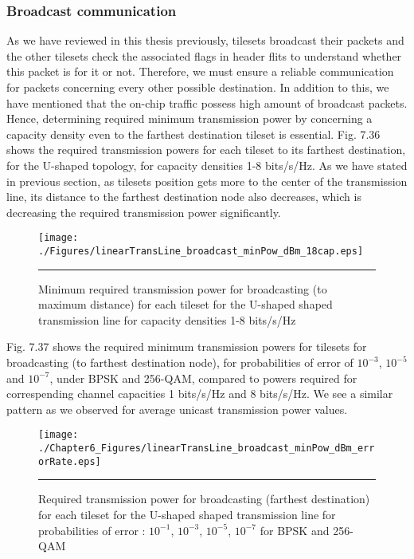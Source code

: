 \subsubsection{Broadcast communication}

As we have reviewed in this thesis previously, tilesets broadcast their packets and the other tilesets check the associated flags in header flits to understand whether this packet is for it or not. Therefore, we must ensure a reliable communication for packets concerning every other possible destination. In addition to this, we have mentioned that the on-chip traffic possess high amount of broadcast packets. Hence, determining required minimum transmission power by concerning a capacity density even to the farthest destination tileset is essential. Fig. 7.36 shows the required transmission powers for each tileset to its farthest destination, for the U-shaped topology, for capacity densities 1-8 bits/s/Hz. As we have stated in previous section, as tilesets position gets more to the center of the transmission line, its distance to the farthest destination node also decreases, which is decreasing the required transmission power significantly. 

\begin{figure}[H]
  \centering
    \texttt{[image: ./Figures/linearTransLine\_broadcast\_minPow\_dBm\_18cap.eps]}
    \rule{35em}{0.5pt}
  \caption[Minimum required transmission power for broadcasting (to maximum distance) for each tileset for the U-shaped shaped transmission line for capacity densities 1-8 bits/s/Hz]{Minimum required transmission power for broadcasting (to maximum distance) for each tileset for the U-shaped shaped transmission line for capacity densities 1-8 bits/s/Hz}
  \label{fig:Electron}
\end{figure}

Fig. 7.37 shows the required minimum transmission powers for tilesets for broadcasting (to farthest destination node), for probabilities of error of $10^{-3}$, $10^{-5}$ and $10^{-7}$, under BPSK and 256-QAM, compared to powers required for correspending channel capacities 1 bits/s/Hz and 8 bits/s/Hz. We see a similar pattern as we observed for average unicast transmission power values. 


    
\begin{figure}[H]
  \centering
    \texttt{[image: ./Chapter6\_Figures/linearTransLine\_broadcast\_minPow\_dBm\_errorRate.eps]}
    \rule{35em}{0.5pt}
  \caption[Required transmission power for broadcasting (farthest destination) for each tileset for the U-shaped shaped transmission line for probabilities of error : $10^{-1}$, $10^{-3}$, $10^{-5}$, $10^{-7}$ for BPSK and 256-QAM]{Required transmission power for broadcasting (farthest destination) for each tileset for the U-shaped shaped transmission line for probabilities of error : $10^{-1}$, $10^{-3}$, $10^{-5}$, $10^{-7}$ for BPSK and 256-QAM}
  \label{fig:Electron}
\end{figure}



